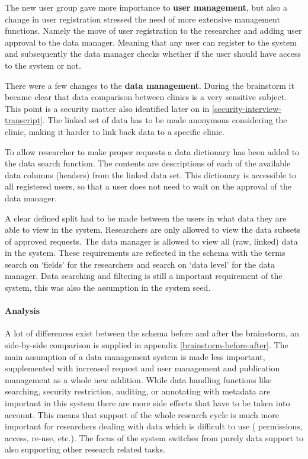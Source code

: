 The new user group gave more importance to \textbf{user management}, but also a change in user registration stressed the need of more extensive management functions.
Namely the move of user registration to the researcher and adding user approval to the data manager.
Meaning that any user can register to the system and subsequently the data manager checks whether if the user should have access to the system or not.

There were a few changes to the \textbf{data management}.
During the brainstorm it became clear that data comparison between clinics is a very sensitive subject.
This point is a security matter also identified later on in \ref{security-interview-transcript}.
The linked set of data has to be made anonymous considering the clinic, making it harder to link back data to a specific clinic.

To allow researcher to make proper requests a data dictionary has been added to the data search function.
The contents are descriptions of each of the available data columns (headers) from the linked data set.
This dictionary is accessible to all registered users, so that a user does not need to wait on the approval of the data manager.

A clear defined split had to be made between the users in what data they are able to view in the system.
Researchers are only allowed to view the data subsets of approved requests.
The data manager is allowed to view all (raw, linked) data in the system.
These requirements are reflected in the schema with the terms search on `fields' for the researchers and search on `data level' for the data manager.
Data searching and filtering is still a important requirement of the system, this was also the assumption in the system seed.

\paragraph{Analysis}
A lot of differences exist between the schema before and after the brainstorm, an side-by-side comparison is supplied in appendix \ref{brainstorm-before-after}.
The main assumption of a data management system is made less important, supplemented with increased request and user management and publication management as a whole new addition.
While data handling functions like searching, security restriction, auditing, or annotating with metadata are important in this system there are more side effects that have to be taken into account.
This means that support of the whole research cycle is much more important for researchers dealing with data which is difficult to use (\ie{} permissions, access, re-use, etc.).
The focus of the system switches from purely data support to also supporting other research related tasks.

